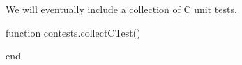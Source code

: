 
\startchapter[title=C Tests]

We will eventually include a collection of C unit tests.

\startLuaCode

function contests.collectCTest()

end

\stopLuaCode

\stopchapter